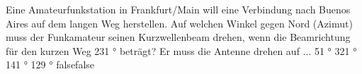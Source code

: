     {Eine Amateurfunkstation in Frankfurt/Main will eine Verbindung nach Buenos Aires auf dem langen Weg herstellen. Auf welchen Winkel gegen Nord (Azimut) muss der Funkamateur seinen Kurzwellenbeam drehen, wenn die Beamrichtung für den kurzen Weg 231 ° beträgt? Er muss die Antenne drehen auf ...}
    {51 °}
    {321 °}
    {141 °}
    {129 °}
    {false}{false}